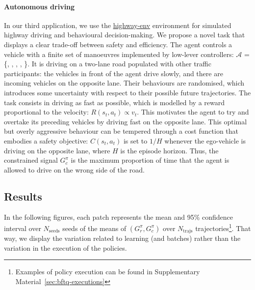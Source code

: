 \documentclass{article}
\begin{document}
\paragraph{Autonomous driving}
In our third application, we use the \href{https://github.com/eleurent/highway-env}{highway-env} environment \citep{Leurent2018} for simulated highway driving and behavioural decision-making.
We propose a novel task that displays a clear trade-off between safety and efficiency. The agent controls a vehicle with a finite set of manoeuvres implemented by low-lever controllers: $\mathcal{A}$ = \{, , , , \}. It is driving on a two-lane road populated with other traffic participants: the vehicles in front of the agent drive slowly, and there are incoming vehicles on the opposite lane. Their behaviours are randomised, which introduces some uncertainty with respect to their possible future trajectories.
The task consists in driving as fast as possible, which is modelled by a reward proportional to the velocity: $R(s_t, a_t) \propto v_t$. This motivates the agent to try and overtake its preceding vehicles by driving fast on the opposite lane. This optimal but overly aggressive behaviour can be tempered through a cost function that embodies a safety objective: $C(s_t, a_t)$ is set to $1/H$ whenever the ego-vehicle is driving on the opposite lane, where $H$ is the episode horizon. Thus, the constrained signal $G_c^\pi$ is the maximum proportion of time that the agent is allowed to drive on the wrong side of the road.

\subsection{Results}

In the following figures, each patch represents the mean and 95\% confidence interval over $N_{\text{seeds}}$ seeds of the means of $(G_r^\pi,G_c^\pi)$ over $N_\text{trajs}$ trajectories\footnote{Examples of policy execution can be found in Supplementary Material~\ref{sec:bftq-executions}}. That way, we display the variation related to learning (and batches) rather than the variation in the execution of the policies.
\end{document}
